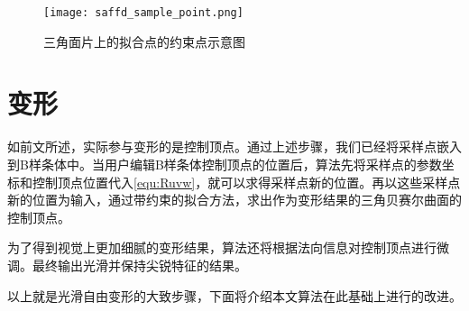 \begin{figure}[htbp]
	\centering
	\texttt{[image: saffd\_sample\_point.png]}
	\caption{三角面片上的拟合点的约束点示意图}\label{fig:saffd_sample_point}
\end{figure}


\section{变形}
如前文所述，实际参与变形的是控制顶点。通过上述步骤，我们已经将采样点嵌入到B样条体中。当用户编辑B样条体控制顶点的位置后，算法先将采样点的参数坐标和控制顶点位置代入\autoref{equ:Ruvw}，就可以求得采样点新的位置。再以这些采样点新的位置为输入，通过带约束的拟合方法，求出作为变形结果的三角贝赛尔曲面的控制顶点。

为了得到视觉上更加细腻的变形结果，算法还将根据法向信息对控制顶点进行微调。最终输出光滑并保持尖锐特征的结果。

以上就是光滑自由变形的大致步骤，下面将介绍本文算法在此基础上进行的改进。
